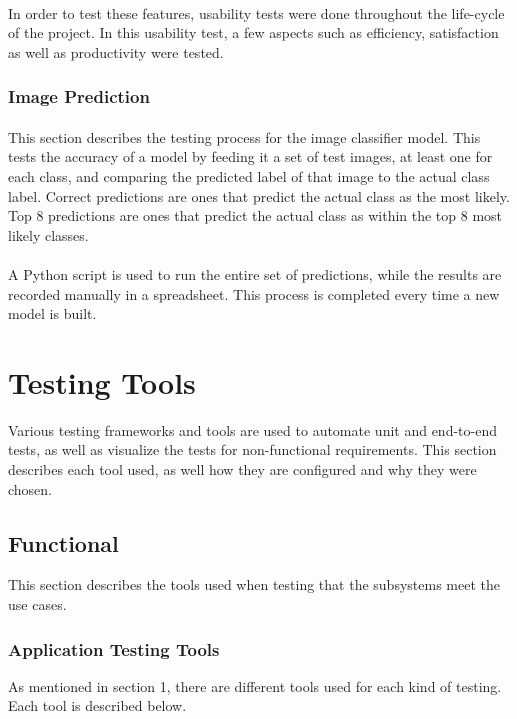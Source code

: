 \documentclass[a4paper, 11pt]{article}
\begin{document}
            \paragraph{}
            In order to test these features, usability tests were done throughout the life-cycle of the project. In this usability test, a few aspects such as efficiency, satisfaction as well as productivity were tested.
            
        \subsubsection{Image Prediction}
            \paragraph{}
            This section describes the testing process for the image classifier model. This tests the accuracy of a model by feeding it a set of test images, at least one for each class, and comparing the predicted label of that image to the actual class label. Correct predictions are ones that predict the actual class as the most likely. Top 8 predictions are ones that predict the actual class as within the top 8 most likely classes.
            \paragraph{}
            A Python script is used to run the entire set of predictions, while the results are recorded manually in a spreadsheet. This process is completed every time a new model is built.

\section{Testing Tools}
Various testing frameworks and tools are used to automate unit and end-to-end tests, as well as visualize the tests for non-functional requirements. This section describes each tool used, as well how they are configured and why they were chosen.

    \subsection{Functional}
    This section describes the tools used when testing that the subsystems meet the use cases.
    
        \subsubsection{Application Testing Tools}
        As mentioned in section 1, there are different tools used for each kind of testing. Each tool is described below.
        
\end{document}
